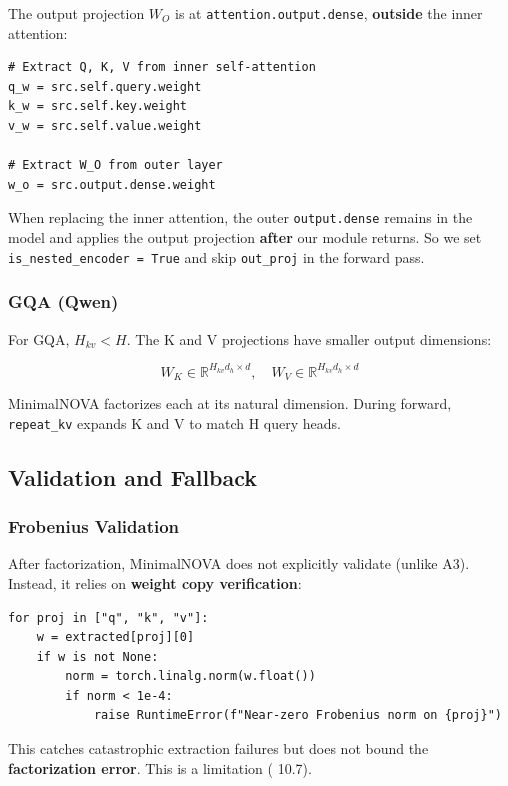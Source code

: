 The output projection $W_O$ is at \texttt{attention.output.dense}, \textbf{outside} the 
inner attention:

\begin{lstlisting}
# Extract Q, K, V from inner self-attention
q_w = src.self.query.weight
k_w = src.self.key.weight
v_w = src.self.value.weight

# Extract W_O from outer layer
w_o = src.output.dense.weight
\end{lstlisting}

When replacing the inner attention, the outer \texttt{output.dense} remains in 
the model and applies the output projection \textbf{after} our module returns. 
So we set \texttt{is\_nested\_encoder = True} and skip \texttt{out\_proj} in the forward 
pass.

\subsubsection{GQA (Qwen)}

For GQA, $H_{kv} < H$. The K and V projections have smaller output 
dimensions:

\[
W_K \in \mathbb{R}^{H_{kv} d_h \times d}, \quad
W_V \in \mathbb{R}^{H_{kv} d_h \times d}
\tag{4.7}
\]

MinimalNOVA factorizes each at its natural dimension. During forward, 
\texttt{repeat\_kv} expands K and V to match H query heads.

\subsection{Validation and Fallback}

\subsubsection{Frobenius Validation}

After factorization, MinimalNOVA does not explicitly validate (unlike A3). 
Instead, it relies on \textbf{weight copy verification}:

\begin{lstlisting}
for proj in ["q", "k", "v"]:
    w = extracted[proj][0]
    if w is not None:
        norm = torch.linalg.norm(w.float())
        if norm < 1e-4:
            raise RuntimeError(f"Near-zero Frobenius norm on {proj}")
\end{lstlisting}

This catches catastrophic extraction failures but does not bound the 
\textbf{factorization error}. This is a limitation ( 10.7).

